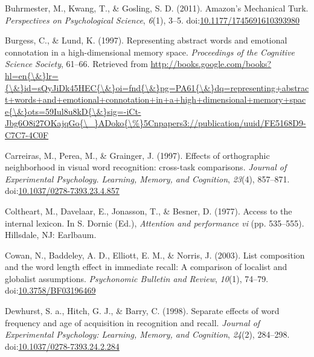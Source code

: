 \documentclass[english,man]{apa6}
\theoremstyle{definition}
\theoremstyle{definition}
\theoremstyle{remark}
\begin{document}
\hypertarget{ref-Buhrmester2011}{}
Buhrmester, M., Kwang, T., \& Gosling, S. D. (2011). Amazon's Mechanical
Turk. \emph{Perspectives on Psychological Science}, \emph{6}(1), 3--5.
doi:\href{https://doi.org/10.1177/1745691610393980}{10.1177/1745691610393980}

\hypertarget{ref-Burgess1997}{}
Burgess, C., \& Lund, K. (1997). Representing abstract words and
emotional connotation in a high-dimensional memory space.
\emph{Proceedings of the Cognitive Science Society}, 61--66. Retrieved
from
\href{http://books.google.com/books?hl=en\%7B/\&\%7Dlr=\%7B/\&\%7Did=sQyJiDk45HEC\%7B/\&\%7Doi=fnd\%7B/\&\%7Dpg=PA61\%7B/\&\%7Ddq=representing+abstract+words+and+emotional+connotation+in+a+high+dimensional+memory+space\%7B/\&\%7Dots=59Iul8u8kD\%7B/\&\%7Dsig=-iCt-Jbg6O8i27OKajqGo\%7B/_\%7DADoko\%7B/\%\%7D5Cnpapers3://publication/uuid/FE5168D9-C7C7-4C0F}{http://books.google.com/books?hl=en\{\textbackslash{}\&\}lr=\{\textbackslash{}\&\}id=sQyJiDk45HEC\{\textbackslash{}\&\}oi=fnd\{\textbackslash{}\&\}pg=PA61\{\textbackslash{}\&\}dq=representing+abstract+words+and+emotional+connotation+in+a+high+dimensional+memory+space\{\textbackslash{}\&\}ots=59Iul8u8kD\{\textbackslash{}\&\}sig=-iCt-Jbg6O8i27OKajqGo\{\textbackslash{}\_\}ADoko\{\textbackslash{}\%\}5Cnpapers3://publication/uuid/FE5168D9-C7C7-4C0F}

\hypertarget{ref-Carreiras1997}{}
Carreiras, M., Perea, M., \& Grainger, J. (1997). Effects of
orthographic neighborhood in visual word recognition: cross-task
comparisons. \emph{Journal of Experimental Psychology. Learning, Memory,
and Cognition}, \emph{23}(4), 857--871.
doi:\href{https://doi.org/10.1037/0278-7393.23.4.857}{10.1037/0278-7393.23.4.857}

\hypertarget{ref-Coltheart1977}{}
Coltheart, M., Davelaar, E., Jonasson, T., \& Besner, D. (1977). Access
to the internal lexicon. In S. Dornic (Ed.), \emph{Attention and
performance vi} (pp. 535--555). Hillsdale, NJ: Earlbaum.

\hypertarget{ref-Cowan2003}{}
Cowan, N., Baddeley, A. D., Elliott, E. M., \& Norris, J. (2003). List
composition and the word length effect in immediate recall: A comparison
of localist and globalist assumptions. \emph{Psychonomic Bulletin and
Review}, \emph{10}(1), 74--79.
doi:\href{https://doi.org/10.3758/BF03196469}{10.3758/BF03196469}

\hypertarget{ref-Dewhurst1998}{}
Dewhurst, S. a., Hitch, G. J., \& Barry, C. (1998). Separate effects of
word frequency and age of acquisition in recognition and recall.
\emph{Journal of Experimental Psychology: Learning, Memory, and
Cognition}, \emph{24}(2), 284--298.
doi:\href{https://doi.org/10.1037/0278-7393.24.2.284}{10.1037/0278-7393.24.2.284}
\end{document}
